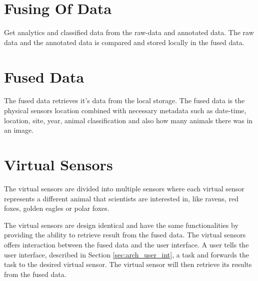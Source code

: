 \documentclass[USenglish]{uit-thesis}
\begin{document}
\section{Fusing Of Data}
Get analytics and classified data from the raw-data and annotated data. The raw data and the annotated data is compared and stored locally in the fused data.


\section{Fused Data}

The fused data retrieves it's data from the local storage. The fused data is the physical sensors location combined with necessary metadata such as date-time, location, site, year, animal classification and also how many animals there was in an image.


\section{Virtual Sensors} \label{sec:arch_vs}
The virtual sensors are divided into multiple sensors where each virtual sensor represents a different animal that scientists are interested in, like ravens, red foxes, golden eagles or polar foxes.

The virtual sensors are design identical and have the same functionalities by providing the ability to retrieve result from the fused data. The virtual sensors offers interaction between the fused data and the user interface. A user tells the user interface, described in Section \ref{sec:arch_user_int}, a task and forwards the task to the desired virtual sensor. The virtual sensor will then retrieve its results from the fused data.


\end{document}
